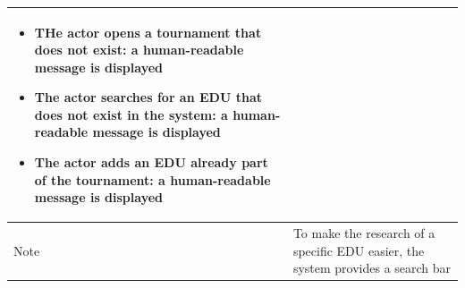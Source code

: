 \begin{center}
\begin{tabular}{| m{2cm} | m{10cm}|}
\begin{itemize}
                                    \item THe actor opens a tournament that does not exist: a human-readable message is displayed
                                    \item The actor searches for an EDU that does not exist in the system: a human-readable message is displayed 
                                    \item The actor adds an EDU already part of the tournament: a human-readable message is displayed 
                                \end{itemize}                                                                                                               \\ \hline
        Note                  & To make the research of a specific EDU easier, the system provides a search bar                                             \\ \hline
    \end{tabular}
\end{center}

